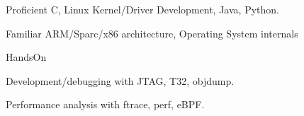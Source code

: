 


\begin{cvskills}

  \cvskill
    {Proficient} %
    {C, Linux Kernel/Driver Development, Java, Python.} %

  \cvskill
    {Familiar} %
    {ARM/Sparc/x86 architecture, Operating System internals} %

  \cvskill
    {HandsOn} %
    {
      \begin{cvitems} %
        \item {Development/debugging with JTAG, T32, objdump.}
        \item {Performance analysis with ftrace, perf, eBPF.}
      \end{cvitems}
    }

\end{cvskills}
